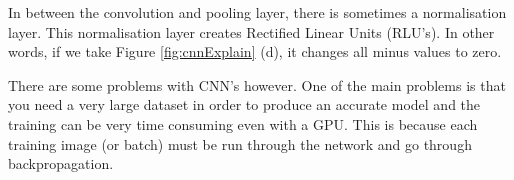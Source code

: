 In between the convolution and pooling layer, there is sometimes a normalisation
layer. This normalisation layer creates Rectified Linear Units (RLU's). In other
words, if we take Figure \ref{fig:cnnExplain} (d), it changes all minus values to
zero.

There are some problems with CNN's however. One of the main problems is that you
need a very large dataset in order to produce an accurate model and the training
can be very time consuming even with a GPU.
This is because each training image (or batch) must be run through the network and go through backpropagation.